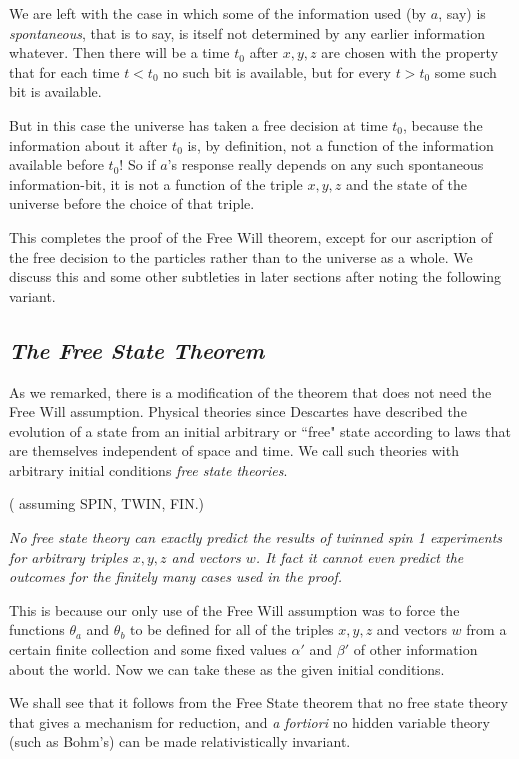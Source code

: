 \documentclass[12pt]{amsart}
\begin{document}
We are left with the case in which some of the information used (by $a$, say) is {\em spontaneous}, that is to say, is itself not determined by any earlier information whatever.  Then there will be a time $t_0$ after $x,y,z$ are chosen with the property that for each time $t < t_0$ no such bit is available, but for every $t > t_0$ some such
bit is available.  

   But in this case the universe has taken a free decision at time $t_0$, because
the information about it after $t_0$ is, by definition, not a function of the
information available before $t_0$!  So if $a$'s response really depends on any
such spontaneous information-bit, it is not a function of the triple $x,y,z$ and the 
state of the universe before the choice of that triple. 

This completes the proof of the Free Will theorem, except for our ascription of the
free decision to the particles rather than to the universe as a whole.  We discuss
this and some other subtleties in later sections after noting the following variant.  

\subsection {\it The Free State Theorem}
As we remarked, there is a modification of the theorem that does not need the Free Will assumption. Physical theories since Descartes have described the evolution of a state from an initial arbitrary or ``free" state according to laws that are themselves independent of space and time. We call such theories with arbitrary initial conditions {\it free state theories}.  

  ( assuming SPIN, TWIN, FIN.)

{\it No free state theory can exactly predict the results of twinned spin 1 experiments for arbitrary triples $x,y,z$ and vectors $w$.  It fact it cannot even predict the 
outcomes for the finitely many cases used in the proof.}  

This is because our only use of the Free Will assumption was to force the 
functions $\theta_a$ and $\theta_b$ 
to be defined for all of the triples $x,y,z$ and 
vectors $w$ from a certain finite collection and some fixed values $\alpha'$ and
$\beta'$ of other information about the world. Now we can take these as the given 
initial conditions.   
  
   We shall see that it follows from the Free State theorem that no free state theory 
that gives a mechanism for reduction, and {\it a fortiori} no hidden variable theory 
(such as Bohm's) can be made relativistically invariant. 
\end{document}
